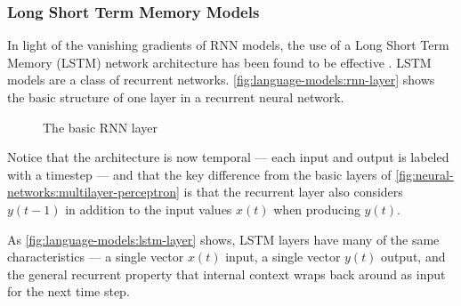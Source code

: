 \subsubsection{Long Short Term Memory Models}\label{sec:language-models:lstms}

In light of the vanishing gradients of RNN models, the use of a Long Short Term Memory (LSTM) network architecture has been found to be effective \cite{lstm}.
LSTM models are a class of recurrent networks.
\autoref{fig:language-models:rnn-layer} shows the basic structure of one layer in a recurrent neural network.
\begin{figure}[h]
    \centering
    \caption{The basic RNN layer}\label{fig:language-models:rnn-layer}
\end{figure}
Notice that the architecture is now temporal --- each input and output is labeled with a timestep --- and that the key difference from the basic layers of \autoref{fig:neural-networks:multilayer-perceptron} is that the recurrent layer also considers $y(t-1)$ in addition to the input values $x(t)$ when producing $y(t)$.

As \autoref{fig:language-models:lstm-layer} shows, LSTM layers have many of the same characteristics --- a single vector $x(t)$ input, a single vector $y(t)$ output, and the general recurrent property that internal context wraps back around as input for the next time step.

